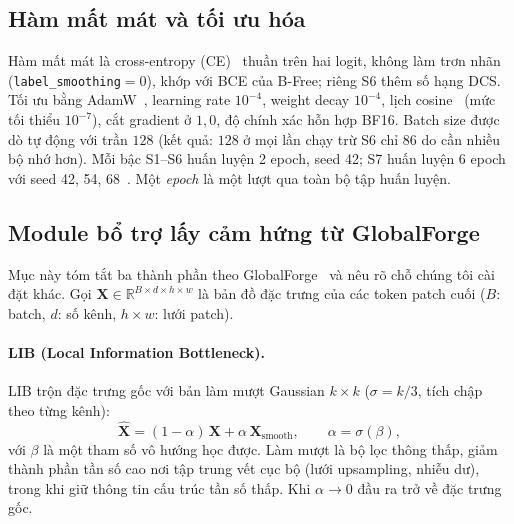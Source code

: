 \documentclass[11pt,a4paper]{article}
\begin{document}
\subsection{Hàm mất mát và tối ưu hóa}
\begin{sloppypar}
Hàm mất mát là cross-entropy (CE)~\cite{goodfellow2016deep} thuần trên hai logit, không làm trơn nhãn (\texttt{label\_smoothing}$=0$), khớp với BCE của B-Free; riêng S6 thêm số hạng DCS. Tối ưu bằng AdamW~\cite{loshchilov2019decoupled}, learning rate $10^{-4}$, weight decay $10^{-4}$, lịch cosine~\cite{loshchilov2017sgdr} (mức tối thiểu $10^{-7}$), cắt gradient ở $1{,}0$, độ chính xác hỗn hợp BF16. Batch size được dò tự động với trần $128$ (kết quả: $128$ ở mọi lần chạy trừ S6 chỉ $86$ do cần nhiều bộ nhớ hơn). Mỗi bậc S1--S6 huấn luyện 2 epoch, seed 42; S7 huấn luyện 6 epoch với seed 42, 54, 68~\cite{baopv051_2025_xla_training_s7_seed_42,baopv051_2025_xla_training_s7_seed_54,baopv051_2025_xla_training_s7_seed_68}. Một \emph{epoch} là một lượt qua toàn bộ tập huấn luyện.
\end{sloppypar}

\subsection{Module bổ trợ lấy cảm hứng từ GlobalForge}\label{sec:modules}
Mục này tóm tắt ba thành phần theo GlobalForge~\cite{cui2026globalforge} và nêu rõ chỗ chúng tôi cài đặt khác. Gọi $\mathbf{X}\in\mathbb{R}^{B\times d\times h\times w}$ là bản đồ đặc trưng của các token patch cuối ($B$: batch, $d$: số kênh, $h\times w$: lưới patch).

\paragraph{LIB (Local Information Bottleneck).} LIB trộn đặc trưng gốc với bản làm mượt Gaussian $k\times k$ ($\sigma=k/3$, tích chập theo từng kênh):
\begin{equation}
\hat{\mathbf{X}}=(1-\alpha)\,\mathbf{X}+\alpha\,\mathbf{X}_{\text{smooth}},\qquad \alpha=\sigma(\beta),
\end{equation}
với $\beta$ là một tham số vô hướng học được. Làm mượt là bộ lọc thông thấp, giảm thành phần tần số cao nơi tập trung vết cục bộ (lưới upsampling, nhiễu dư), trong khi giữ thông tin cấu trúc tần số thấp. Khi $\alpha\to0$ đầu ra trở về đặc trưng gốc.
\end{document}
